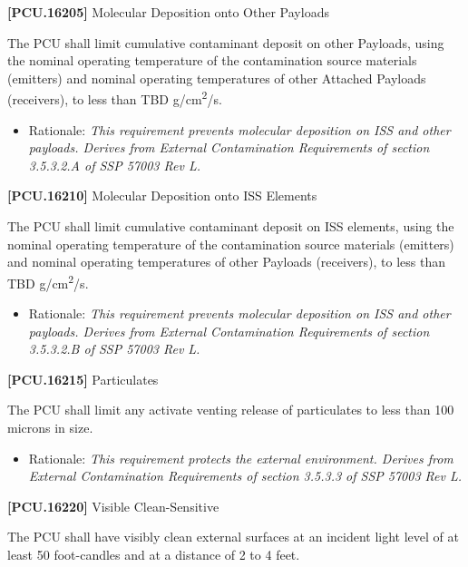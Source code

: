 \textbf{[PCU.16205]} Molecular Deposition onto Other Payloads

The \gls{PCU} shall limit cumulative contaminant deposit on other Payloads, using the nominal operating temperature of the contamination source materials (emitters) and nominal operating temperatures of other Attached Payloads (receivers), to less than TBD\label{tbx_17} g\slash cm\textsuperscript{2}\slash s.

\begin{itemize}
\item{} Rationale: \emph{This requirement prevents molecular deposition on ISS and other payloads. Derives from External Contamination Requirements of section 3.5.3.2.A of SSP 57003 Rev L.}

\end{itemize}

\textbf{[PCU.16210]} Molecular Deposition onto \gls{ISS} Elements

The \gls{PCU} shall limit cumulative contaminant deposit on \gls{ISS} elements, using the nominal operating temperature of the contamination source materials (emitters) and nominal operating temperatures of other Payloads (receivers), to less than TBD\label{tbx_18} g\slash cm\textsuperscript{2}\slash s.

\begin{itemize}
\item{} Rationale: \emph{This requirement prevents molecular deposition on ISS and other payloads. Derives from External Contamination Requirements of section 3.5.3.2.B of SSP 57003 Rev L.}

\end{itemize}

\textbf{[PCU.16215]} Particulates

The \gls{PCU} shall limit any activate venting release of particulates to less than 100 microns in size.

\begin{itemize}
\item{} Rationale: \emph{This requirement protects the external environment. Derives from External Contamination Requirements of section 3.5.3.3 of SSP 57003 Rev L.}

\end{itemize}

\textbf{[PCU.16220]} Visible Clean-Sensitive

The \gls{PCU} shall have visibly clean external surfaces at an incident light level of at least 50 foot-candles and at a distance of 2 to 4 feet.

